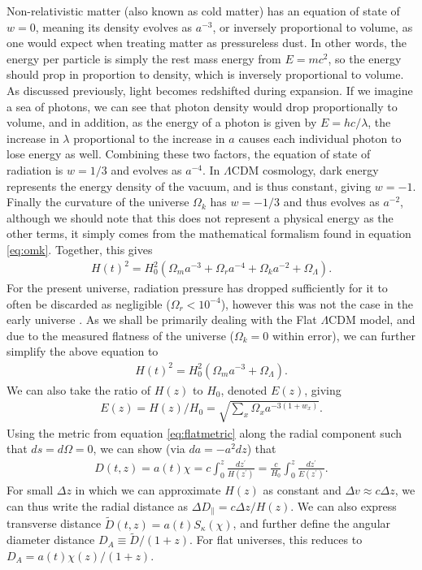 \documentclass[titlesmallcaps, examinerscopy, copyrightpage]{uqthesis}
\begin{document}
Non-relativistic matter (also known as cold matter) has an equation of state of $w = 0$, meaning its density evolves as $a^{-3}$, or inversely proportional to volume, as one would expect when treating matter as pressureless dust. In other words, the energy per particle is simply the rest mass energy from $E=mc^2$, so the energy should prop in proportion to density, which is inversely proportional to volume. As discussed previously, light becomes redshifted during expansion. If we imagine a sea of photons, we can see that photon density would drop proportionally to volume, and in addition, as the energy of a photon is given by $E=hc/\lambda$, the increase in $\lambda$ proportional to the increase in $a$ causes each individual photon to lose energy as well. Combining these two factors, the equation of state of radiation is $w = 1/3$ and evolves as $a^{-4}$. In $\Lambda$CDM cosmology, dark energy represents the energy density of the vacuum, and is thus constant, giving $w = -1$. Finally the curvature of the universe $\Omega_k$ has $w=-1/3$ and thus evolves as $a^{-2}$, although we should note that this does not represent a physical energy as the other terms, it simply comes from the mathematical formalism found in equation \eqref{eq:omk}. Together, this gives
\begin{align} \label{eq:dynamics}
H(t)^2 = H_0^2 \left( \Omega_m a^{-3} + \Omega_r a^{-4} + \Omega_k a^{-2} + \Omega_\Lambda \right).
\end{align}
For the present universe, radiation pressure has dropped sufficiently for it to often be discarded as negligible ($\Omega_r < 10^{-4}$), however this was not the case in the early universe \citep{Planck201416, RydenPartridge2004}. As we shall be primarily dealing with the Flat $\Lambda$CDM model, and due to the measured flatness of the universe ($\Omega_k = 0$ within error), we can further simplify the above equation to
\begin{align}
H(t)^2 = H_0^2 \left( \Omega_m a^{-3} + \Omega_\Lambda \right).
\end{align}
We can also take the ratio of $H(z)$ to $H_0$, denoted $E(z)$, giving
\begin{align}
E(z) = H(z) / H_0 = \sqrt{\sum_x \Omega_x a^{-3(1+w_x)}}.
\end{align}
Using the metric from equation \eqref{eq:flatmetric} along the radial component such that $ds = d\Omega = 0$, we can show (via $da = -a^2 dz$) that 
\begin{align}
D(t,z) = a(t) \chi = c \int_0^z \frac{d z^\prime}{H(z^\prime)} = \frac{c}{H_0} \int_0^z \frac{dz^\prime}{E(z^\prime)}.
\end{align}
For small $\Delta z$ in which we can approximate $H(z)$ as constant and $\Delta v \approx c \Delta z$, we can thus write the radial distance as $\Delta D_\parallel = c\Delta z/H(z)$. We can also express transverse distance $\tilde{D}(t,z) = a(t) S_\kappa(\chi)$, and further define the angular diameter distance $D_A \equiv \tilde{D} / (1 + z)$. For flat universes, this reduces to $D_A = a(t) \chi(z) / (1 + z)$.
\end{document}

